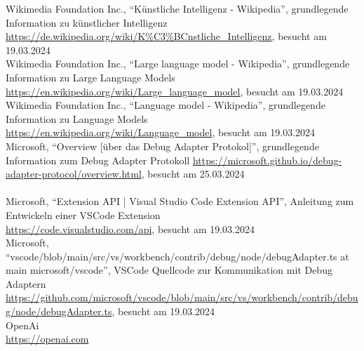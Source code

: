 \documentclass[a4paper,12pt,ngerman]{scrartcl}
\begin{document}
Wikimedia Foundation Inc.,  ``Künstliche Intelligenz - Wikipedia'', grundlegende Information zu künstlicher Intelligenz\\
\url{https://de.wikipedia.org/wiki/K\%C3\%BCnstliche_Intelligenz}, besucht am 19.03.2024\\
Wikimedia Foundation Inc.,  ``Large language model - Wikipedia'', grundlegende Information zu Large Language Models\\
\url{https://en.wikipedia.org/wiki/Large_language_model}, besucht am 19.03.2024\\
Wikimedia Foundation Inc.,  ``Language model - Wikipedia'', grundlegende Information zu Language Models \\
\url{https://en.wikipedia.org/wiki/Language_model}, besucht am 19.03.2024\\
Microsoft, ``Overview [über das Debug Adapter Protokol]'', grundlegende Information zum Debug Adapter Protokoll
\url{https://microsoft.github.io/debug-adapter-protocol/overview.html}, besucht am 25.03.2024\\
\vspace{1em}\\
Microsoft, ``Extension API | Visual Studio Code Extension API'', Anleitung zum Entwickeln einer VSCode Extension\\
\url{https://code.visualstudio.com/api}, besucht am 19.03.2024\\
Microsoft, ``vscode/blob/main/src/vs/workbench/contrib/debug/node/debugAdapter.ts at main microsoft/vscode'', VSCode Quellcode zur Kommunikation mit Debug Adaptern\\
\url{https://github.com/microsoft/vscode/blob/main/src/vs/workbench/contrib/debug/node/debugAdapter.ts}, besucht am 19.03.2024\\
OpenAi\\
\url {https://openai.com}\\
\end{document}
